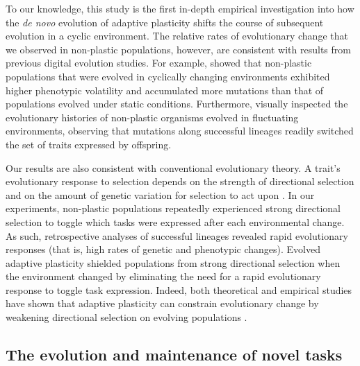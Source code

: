 To our knowledge, this study is the first in-depth empirical investigation into how the \textit{de novo} evolution of adaptive plasticity shifts the course of subsequent evolution in a cyclic environment.
The relative rates of evolutionary change that we observed in non-plastic populations, however, are consistent with results from previous digital evolution studies. 
For example, \cite{dolson_interpreting_2020} showed that non-plastic populations that were evolved in cyclically changing environments exhibited higher phenotypic volatility and accumulated more mutations than that of populations evolved under static conditions.
Furthermore, \cite{lalejini_evolutionary_2016} visually inspected the evolutionary histories of non-plastic organisms evolved in fluctuating environments, observing that mutations along successful lineages readily switched the set of traits expressed by offspring.


Our results are also consistent with conventional evolutionary theory.
A trait's evolutionary response to selection depends on the strength of directional selection and on the amount of genetic variation for selection to act upon \citep{lande_measurement_1983,zimmer_evolution_2013}.
In our experiments, non-plastic populations repeatedly experienced strong directional selection to toggle which tasks were expressed after each environmental change.
As such, retrospective analyses of successful lineages revealed rapid evolutionary responses (that is, high rates of genetic and phenotypic changes).
Evolved adaptive plasticity shielded populations from strong directional selection when the environment changed by eliminating the need for a rapid evolutionary response to toggle task expression.
Indeed, both theoretical and empirical studies have shown that adaptive plasticity can constrain evolutionary change by weakening directional selection on evolving populations \citep{price_role_2003,paenke_influence_2007,ghalambor_non-adaptive_2015}. 


\subsection{The evolution and maintenance of novel tasks}

